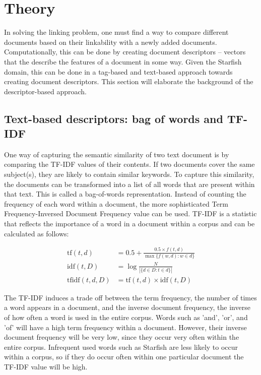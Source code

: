\section{Theory}

In solving the linking problem, one must find a way to compare different
documents based on their linkability with a newly added documents.
Computationally, this can be done by creating document descriptors -- vectors
that the describe the features of a document in some way. Given the Starfish
domain, this can be done in a tag-based and text-based approach towards
creating document descriptors. This section will elaborate the background of
the descriptor-based approach. 

\subsection{Text-based descriptors: bag of words and TF-IDF}
One way of capturing the semantic similarity of two text document is by
comparing the TF-IDF values of their contents. If two documents cover the same
subject(s), they are likely to contain similar keywords. To capture this
similarity, the documents can be transformed into a list of all words that are
present within that text. This is called a bag-of-words representation. Instead
of counting the frequency of each word within a document, the more
sophisticated Term Frequency-Inversed Document Frequency value can be used.
TF-IDF is a statistic that reflects the importance of a word in a document
within a corpus and can be calculated as follows:

\begin{align}
  \textrm{tf}(t,d)      &= 0.5 + \frac{0.5 \times {f}(t, d)}{\max\{{f}(w, d):w \in d\}}\\
  \textrm{idf}(t, D)    &=  \log \frac{N}{|\{d \in D: t \in d\}|}\\
  \textrm{tfidf}(t,d,D) &= \textrm{tf}(t,d) \times \textrm{idf}(t, D)
\end{align}

The TF-IDF induces a trade off between the term frequency, the number of times
a word appears in a document, and the inverse document frequency, the inverse
of how often a word is used in the entire corpus. Words such as 'and', 'or',
and 'of' will have a high term frequency within a document. However, their
inverse document frequency will be very low, since they occur very often within
the entire corpus. Infrequent used words such as Starfish are less likely to
occur within a corpus, so if they do occur often within one particular document
the TF-IDF value will be high. 

